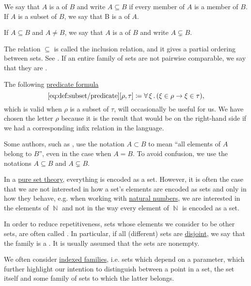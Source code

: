 \begin{definition}\label{def:subset}
  We say that \( A \) is a  of \( B \) and write \( A \subseteq B \) if every member of \( A \) is a member of \( B \). If \( A \) is a subset of \( B \), we say that B is a  of \( A \).

  If \( A \subseteq B \) and \( A \neq B \), we say that \( A \) is a  of \( B \) and write \( A \subsetneq B \).

  The relation \( \subseteq \) is called the inclusion relation, and it gives a partial ordering between sets. See . If an entire family of sets are not pairwise comparable, we say that they are .

  The following \hyperref[rem:predicate_formula]{predicate formula}
  \begin{equation*}\taglabel[\op{IsSubset}]{eq:def:subset/predicate}
    \ref{eq:def:subset/predicate}[\rho, \tau] \coloneqq \qforall \xi (\xi \in \rho \rightarrow \xi \in \tau),
  \end{equation*}
  which is valid when \( \rho \) is a subset of \( \tau \), will occasionally be useful for us. We have chosen the letter \( \rho \) because it is the result that would be on the right-hand side if we had a corresponding infix relation in the language.
\end{definition}

\begin{remark}\label{rem:subset_notation}
  Some authors, such as \cite{Kelley1955}, use the notation \( A \subset B \) to mean \enquote{all elements of \( A \) belong to \( B \)}, even in the case when \( A = B \). To avoid confusion, we use the notations \( A \subseteq B \) and \( A \subsetneq B \).
\end{remark}

\begin{remark}\label{rem:family_of_sets}
  In a \hyperref[rem:pure_set_theory]{pure set theory}, everything is encoded as a set. However, it is often the case that we are not interested in how a set's elements are encoded as sets and only in how they behave, e.g. when working with \hyperref[def:set_of_natural_numbers]{natural numbers}, we are interested in the elements of \( \BbbN \) and not in the way every element of \( \BbbN \) is encoded as a set.

  In order to reduce repetitiveness, sets whose elements we consider to be other sets, are often called . In particular, if all (different) sets are \hyperref[def:subset]{disjoint}, we say that the family is a . It is usually assumed that the sets are nonempty.

  We often consider \hyperref[def:cartesian_product/indexed_family]{indexed families}, i.e. sets which depend on a parameter, which further highlight our intention to distinguish between a point in a set, the set itself and some family of sets to which the latter belongs.
\end{remark}

